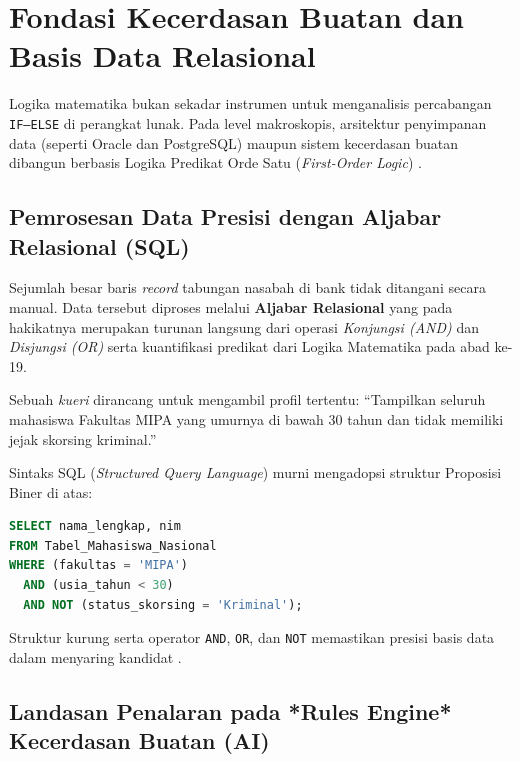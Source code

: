 \section{Fondasi Kecerdasan Buatan dan Basis Data Relasional}

Logika matematika bukan sekadar instrumen untuk menganalisis percabangan \texttt{IF--ELSE} di perangkat lunak. Pada level makroskopis, arsitektur penyimpanan data (seperti Oracle dan PostgreSQL) maupun sistem kecerdasan buatan dibangun berbasis Logika Predikat Orde Satu (\textit{First-Order Logic}) \cite{mit_6042,rosen2019}.

\subsection{Pemrosesan Data Presisi dengan Aljabar Relasional (SQL)}

Sejumlah besar baris \textit{record} tabungan nasabah di bank tidak ditangani secara manual. Data tersebut diproses melalui \textbf{Aljabar Relasional} yang pada hakikatnya merupakan turunan langsung dari operasi \textit{Konjungsi (AND)} dan \textit{Disjungsi (OR)} serta kuantifikasi predikat dari Logika Matematika pada abad ke-19.

\begin{contoh}
Sebuah \textit{kueri} dirancang untuk mengambil profil tertentu: ``Tampilkan seluruh mahasiswa Fakultas MIPA yang umurnya di bawah 30 tahun dan tidak memiliki jejak skorsing kriminal.''

Sintaks SQL (\textit{Structured Query Language}) murni mengadopsi struktur Proposisi Biner di atas:
\begin{lstlisting}[language=SQL, basicstyle=\ttfamily\small, frame=single, caption={Analisis Klausa \texttt{WHERE} dengan Operator Logika Boolean}]
SELECT nama_lengkap, nim 
FROM Tabel_Mahasiswa_Nasional
WHERE (fakultas = 'MIPA') 
  AND (usia_tahun < 30) 
  AND NOT (status_skorsing = 'Kriminal');
\end{lstlisting}
Struktur kurung serta operator \texttt{AND}, \texttt{OR}, dan \texttt{NOT} memastikan presisi basis data dalam menyaring kandidat \cite{rosen2019}.
\end{contoh}

\subsection{Landasan Penalaran pada *Rules Engine* Kecerdasan Buatan (AI)}

